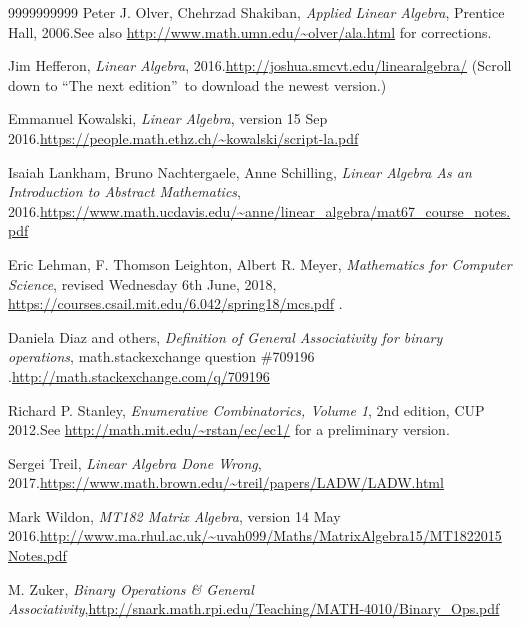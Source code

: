 \documentclass[numbers=enddot,12pt,final,onecolumn,notitlepage]{scrartcl}%
\theoremstyle{definition}
\begin{document}
\begin{thebibliography}{9999999999}
Peter J. Olver, Chehrzad Shakiban, \textit{Applied
Linear Algebra}, Prentice Hall, 2006.\newline See also
\url{http://www.math.umn.edu/~olver/ala.html} for corrections.

Jim Hefferon, \textit{Linear Algebra},
2016.\newline\url{http://joshua.smcvt.edu/linearalgebra/} (Scroll down to
\textquotedblleft The next edition\textquotedblright\ to download the newest version.)

Emmanuel Kowalski, \textit{Linear Algebra},
version 15 Sep 2016.\newline\url{https://people.math.ethz.ch/~kowalski/script-la.pdf}

Isaiah Lankham, Bruno Nachtergaele, Anne
Schilling, \textit{Linear Algebra As an Introduction to Abstract Mathematics},
2016.\newline\url{https://www.math.ucdavis.edu/~anne/linear_algebra/mat67_course_notes.pdf}

Eric Lehman, F. Thomson Leighton, Albert R. Meyer,
\textit{Mathematics for Computer Science}, revised Wednesday 6th June, 2018,
\newline\url{https://courses.csail.mit.edu/6.042/spring18/mcs.pdf} .

Daniela Diaz and others, \textit{Definition of
General Associativity for binary operations}, math.stackexchange question
\#709196 .\newline\url{http://math.stackexchange.com/q/709196}

Richard P. Stanley, \textit{Enumerative
Combinatorics, Volume 1}, 2nd edition, CUP 2012.\newline See
\url{http://math.mit.edu/~rstan/ec/ec1/} for a preliminary version.

Sergei Treil, \textit{Linear Algebra Done Wrong},
2017.\newline\url{https://www.math.brown.edu/~treil/papers/LADW/LADW.html}

Mark Wildon, \textit{MT182 Matrix Algebra},
version 14 May 2016.\newline\url{http://www.ma.rhul.ac.uk/~uvah099/Maths/MatrixAlgebra15/MT1822015Notes.pdf}

M. Zuker, \textit{Binary Operations \& General
Associativity},\newline\url{http://snark.math.rpi.edu/Teaching/MATH-4010/Binary_Ops.pdf}
\end{thebibliography}
\end{document}

